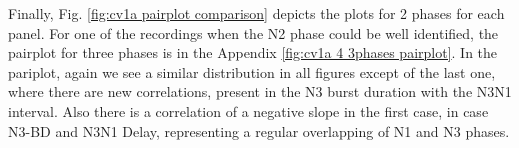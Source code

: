 Finally, Fig. \ref{fig:cv1a pairplot comparison} depicts the plots for 2 phases for each panel. For one of the recordings when the N2 phase could be well identified, the pairplot for three phases is in the Appendix \ref{fig:cv1a 4 3phases pairplot}. In the pariplot, again we see a similar distribution in all figures except of the last one, where there are new correlations, present in the N3 burst duration with the N3N1 interval. Also there is a correlation of a negative slope in the first case, in case N3-BD and N3N1 Delay, representing a regular overlapping of N1 and N3 phases. 
%

